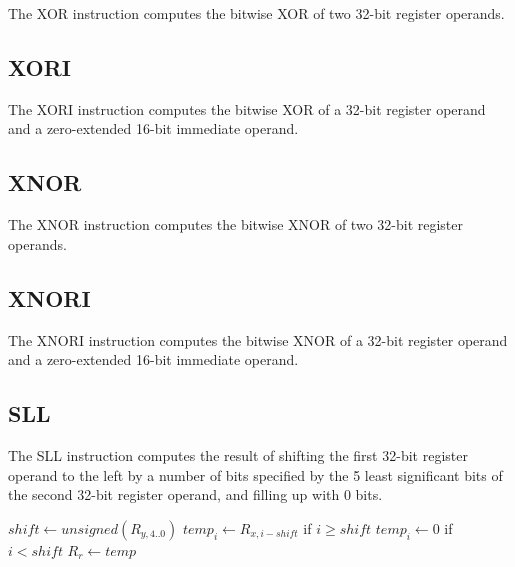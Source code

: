 The XOR instruction computes the bitwise XOR of two 32-bit register operands.\\



\subsection{XORI}

The XORI instruction computes the bitwise XOR of a 32-bit register operand and a zero-extended 16-bit immediate operand.\\



\subsection{XNOR}

The XNOR instruction computes the bitwise XNOR of two 32-bit register operands.\\



\subsection{XNORI}

The XNORI instruction computes the bitwise XNOR of a 32-bit register operand and a zero-extended 16-bit immediate operand.\\



\subsection{SLL}

The SLL instruction computes the result of shifting the first 32-bit register operand to the left by a number of bits specified by the 5 least significant bits of the second 32-bit register operand, and filling up with 0 bits.\\


\begin{effectize}
\effect $shift \leftarrow unsigned(R_{y,4..0})$
\effect $temp_i \leftarrow R_{x,i-shift}$ if $i \geq shift$
\effect $temp_i \leftarrow 0$ if $i < shift$
\effect $R_r \leftarrow temp$
\end{effectize}

